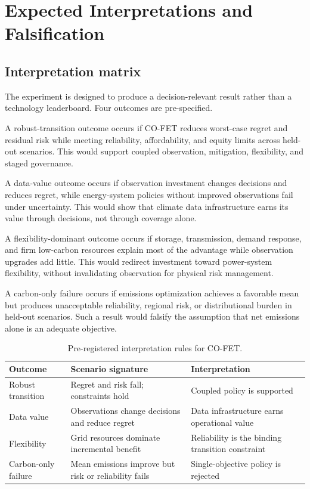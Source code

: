 \documentclass[conference]{IEEEtran}
\begin{document}
\section{Expected Interpretations and Falsification}
\subsection{Interpretation matrix}
The experiment is designed to produce a decision-relevant result rather than a technology leaderboard. Four outcomes are pre-specified.

A robust-transition outcome occurs if CO-FET reduces worst-case regret and residual risk while meeting reliability, affordability, and equity limits across held-out scenarios. This would support coupled observation, mitigation, flexibility, and staged governance.

A data-value outcome occurs if observation investment changes decisions and reduces regret, while energy-system policies without improved observations fail under uncertainty. This would show that climate data infrastructure earns its value through decisions, not through coverage alone.

A flexibility-dominant outcome occurs if storage, transmission, demand response, and firm low-carbon resources explain most of the advantage while observation upgrades add little. This would redirect investment toward power-system flexibility, without invalidating observation for physical risk management.

A carbon-only failure occurs if emissions optimization achieves a favorable mean but produces unacceptable reliability, regional risk, or distributional burden in held-out scenarios. Such a result would falsify the assumption that net emissions alone is an adequate objective.

\begin{table}[t]
\centering
\caption{Pre-registered interpretation rules for CO-FET.}
\label{tab:decisions}
\footnotesize
\begin{tabular}{P{2.0cm}P{2.5cm}P{2.5cm}}
\toprule
Outcome & Scenario signature & Interpretation \\
\midrule
Robust transition & Regret and risk fall; constraints hold & Coupled policy is supported \\
Data value & Observations change decisions and reduce regret & Data infrastructure earns operational value \\
Flexibility & Grid resources dominate incremental benefit & Reliability is the binding transition constraint \\
Carbon-only failure & Mean emissions improve but risk or reliability fails & Single-objective policy is rejected \\
\bottomrule
\end{tabular}
\end{table}
\end{document}
